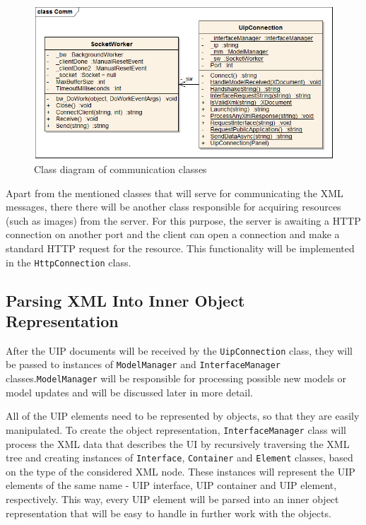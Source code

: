 \begin{figure}[ht!]
\centering
\includegraphics[width=145mm]{pics/3/classComm.png}
\caption{Class diagram of communication classes}
\label{fig:classComm}
\end{figure}

Apart from the mentioned classes that will serve for communicating the XML messages, there there will be another class responsible for acquiring resources (such as images) from the server. For this purpose, the server is awaiting a HTTP connection on another port and the client can open a connection and make a standard HTTP request for the resource. This functionality will be implemented in the \texttt{HttpConnection} class.

\subsection{Parsing XML Into Inner Object Representation}
After the UIP documents will be received by the \texttt{UipConnection} class, they will be passed to instances of \texttt{ModelManager} and \texttt{InterfaceManager} classes.\linebreak \texttt{ModelManager} will be responsible for processing possible new models or model updates and will be discussed later in more detail.

All of the UIP elements need to be represented by objects, so that they are easily manipulated. To create the object representation, \texttt{InterfaceManager} class will process the XML data that describes the UI by recursively traversing the XML tree and creating instances of \texttt{Interface}, \texttt{Container} and \texttt{Element} classes, based on the type of the considered XML node. These instances will represent the UIP elements of the same name - UIP interface, UIP container and UIP element, respectively. This way, every UIP element will be parsed into an inner object representation that will be easy to handle in further work with the objects.

